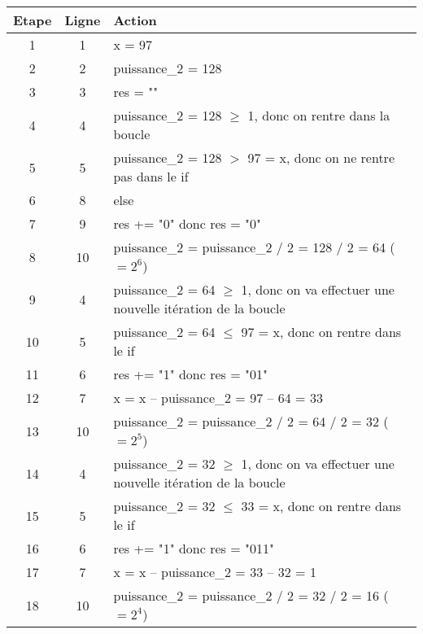 \documentclass[11pt,a4paper]{exam}
\begin{document}
\begin{questions}
\begin{spacing}{1}
\begin{solution}
             	\begin{center}		
             		\begin{tabular}{|c|c|l|}
             			\hline
             			\textbf{Etape} & \textbf{Ligne} & \textbf{Action} \\ \hline
             			1 & 1 & x = 97 \\ \hline
             			2 & 2 & puissance\_2 = 128 \\ \hline
             			3 & 3 & res = "" \\ \hline
             			4 & 4 & puissance\_2 = 128 $\ge$ 1, donc on rentre dans la boucle \\ \hline
             			5 & 5 & puissance\_2 = 128 $>$ 97 = x, donc on ne rentre pas dans le if \\ \hline
             			6 & 8 & else \\ \hline
             			7 & 9 & res += "0" donc res = "0" \\ \hline
             			8 & 10 & puissance\_2 = puissance\_2 / 2 = 128 / 2 = 64 ($= 2^6$) \\ \hline
             			9 & 4 & puissance\_2 = 64 $\ge$ 1, donc on va effectuer une nouvelle itération de la boucle \\ \hline
             			10 & 5 & puissance\_2 = 64 $\le$ 97 = x, donc on rentre dans le if \\ \hline
             			11 & 6 & res += "1" donc res = "01" \\ \hline
             			12 & 7 & x = x -- puissance\_2 = 97 -- 64 = 33 \\ \hline
             			13 & 10 & puissance\_2 = puissance\_2 / 2 = 64 / 2 = 32 ($= 2^5$) \\ \hline
             			14 & 4 & puissance\_2 = 32 $\ge$ 1, donc on va effectuer une nouvelle itération de la boucle \\ \hline
             			15 & 5 & puissance\_2 = 32 $\le$ 33 = x, donc on rentre dans le if \\ \hline
             			16 & 6 & res += "1" donc res = "011" \\ \hline
             			17 & 7 & x = x -- puissance\_2 = 33 -- 32 = 1 \\ \hline
             			18 & 10 & puissance\_2 = puissance\_2 / 2 = 32 / 2 = 16 ($= 2^4$) \\ \hline
             		\end{tabular}
             	\end{center}
             	

\end{solution}
\end{spacing}
\end{questions}
\end{document}
